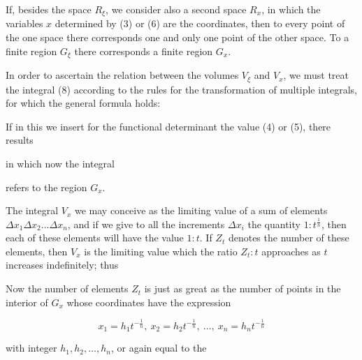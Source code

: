 If, besides the space $R_\xi$, we consider also a second space $R_x$,
in which the variables $x$ determined by (3) or (6) are the
coordinates, then to every point of the one space there corresponds
one and only one point of the other space. To a finite %
region $G_\xi$ there corresponds a finite region $G_x$.

In order to ascertain the relation between the volumes $V_\xi$ and $V_x$,
we must treat the integral (8) according to the rules for the
transformation of multiple integrals, for which the general formula holds:



If in this we insert for the functional determinant the value (4) or
(5), there results


in which now the integral


refers to the region $G_x$.

The integral $V_x$ we may conceive as the limiting value of a sum of
elements $\Delta x_1 \Delta x_2 \ldots \Delta x_n$, and
if we give to all the increments $\Delta x_i$ the quantity $1 : t^{\frac1n}$,
then each of these elements will have the value $1 : t$.
If $Z_t$ denotes the number of these elements, then $V_x$ is the
limiting value which the ratio $Z_t : t$ approaches as $t$
increases indefinitely; thus


Now the number of elements $Z_t$ is just as great as the number of
points in the interior of $G_x$ whose coordinates have the
expression

\[
x_1 = h_1 t^{-\frac1n},\ x_2 = h_2 t^{-\frac1n},\ \ldots,\ x_n = h_n t^{-\frac1n}
\]

with integer $h_1, h_2, \ldots, h_n$, or again equal to the
